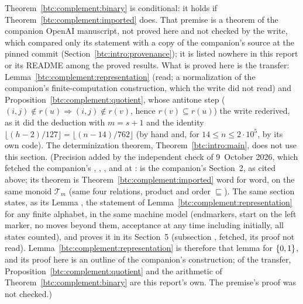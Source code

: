 \begin{writenote}
Theorem~\ref{btc:complement:binary} is conditional: it holds if
Theorem~\ref{btc:complement:imported} does. That premise is a theorem of the
companion OpenAI manuscript, not proved here and not checked by the write,
which compared only its statement with a copy of the companion's source at
the pinned commit (Section~\ref{btc:intro:provenance}); it is listed nowhere
in this report or its README among the proved results. What is proved here is
the transfer: Lemma~\ref{btc:complement:representation} (read; a
normalization of the companion's finite-computation construction, which the
write did not read) and Proposition~\ref{btc:complement:quotient}, whose
antitone step ($(i,j)\notin r(u)\Rightarrow(i,j)\notin r(v)$, hence
$r(v)\subseteq r(u)$) the write rederived, as it did the deduction with $m=s+1$
and the identity $\lfloor(h-2)/127\rfloor=\lfloor(n-14)/762\rfloor$ (by hand
and, for $14\le n\le2\cdot10^5$, by its own code). The determinization
theorem, Theorem~\ref{btc:intro:main}, does not use this section.
\textup{(Precision added by the independent check of 9~October 2026, which
fetched the companion's , ,
,  and
 at
:  is the companion's Section~2, as cited
above; its theorem  is
Theorem~\ref{btc:complement:imported} word for word, on the same monoid
$\mathcal T_m$ (same four relations, product and order $\sqsubseteq$). The
same section states, as its Lemma , the statement
of Lemma~\ref{btc:complement:representation} for any finite alphabet, in the
same machine model (endmarkers, start on the left marker, no moves beyond
them, acceptance at any time including initially, all states counted), and
proves it in its Section~5 (subsection ,
fetched, its proof not read). Lemma~\ref{btc:complement:representation}
is therefore that lemma for $\{0,1\}$, and its proof here is an outline of the
companion's construction; of the transfer, Proposition~\ref{btc:complement:quotient}
and the arithmetic of Theorem~\ref{btc:complement:binary} are this report's
own. The premise's proof was not checked.)}
\end{writenote}
